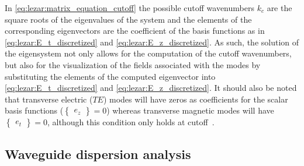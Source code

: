 In \eqref{eq:lezar:matrix_equation_cutoff} the possible cutoff
wavenumbers $k_c$ are the square roots of the eigenvalues of the
system and the elements of the corresponding eigenvectors are the
coefficient of the basis functions as
in \eqref{eq:lezar:E_t_discretized}
and \eqref{eq:lezar:E_z_discretized}. As such, the solution of the
eigensystem not only allows for the computation of the cutoff
wavenumbers, but also for the visualization of the fields associated
with the modes by substituting the elements of the computed
eigenvector into \eqref{eq:lezar:E_t_discretized}
and \eqref{eq:lezar:E_z_discretized}. It should also be noted that
transverse electric ($TE$) modes will have zeros as coefficients for
the scalar basis functions ($\begin{Bmatrix}e_z\end{Bmatrix} = 0$)
whereas transverse magnetic modes will have
$\begin{Bmatrix}e_t\end{Bmatrix} = 0$, although this condition only
holds at cutoff~\citep{Pozar2005}.

\subsection{Waveguide dispersion analysis}
\label{lezar:sec:propagation_curves}

